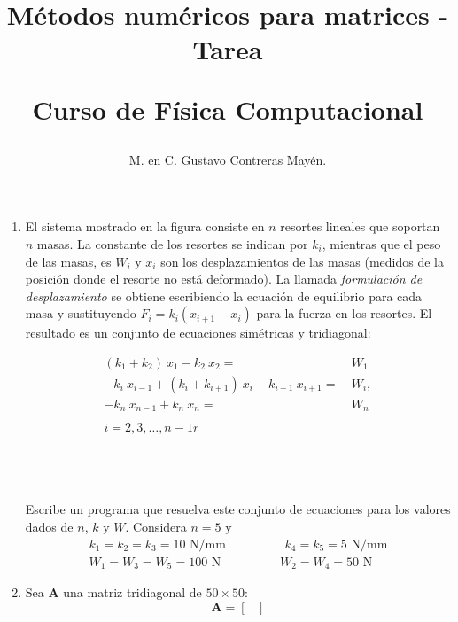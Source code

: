 \documentclass[12pt]{article}
\author{M. en C. Gustavo Contreras Mayén.}
\title{Métodos numéricos para matrices - Tarea \\ \begin{Large}Curso de Fí­sica Computacional\end{Large}}
\date{ }
\numberwithin{equation}{section}
\begin{document}
\fontsize{14}{14}\selectfont
\maketitle
\begin{enumerate}
\item El sistema mostrado en la figura consiste en $n$ resortes lineales que soportan $n$ masas. La constante de los resortes se indican por $k_{i}$, mientras que el peso de las masas, es $W_{i}$ y $x_{i}$ son los desplazamientos de las masas (medidos de la posición donde el resorte no está deformado). La llamada \emph{formulación de desplazamiento} se obtiene escribiendo la ecuación de equilibrio para cada masa y sustituyendo $F_{i} = k_{i}(x_{i + 1} - x_{i})$ para la fuerza en los resortes. El resultado es un conjunto de ecuaciones simétricas y tridiagonal:
\\
\begin{minipage}{0.5\textwidth}
\[ \begin{split}
(k_{1} + k_{2}) \: x_{1} - k_{2} \: x_{2} =& \: W_{1} \\
-k_{i} \: x_{i-1} + (k_{i} + k_{i+1}) \: x_{i} - k_{i+1} \: x_{i+1} =& \:  W_{i}, \\
-k_{n} \:  x_{n-1} + k_{n} \: x_{n} =& \: W_{n}
\\
\\
 i = 2, 3, \ldots, n-1r
\end{split} \]
\end{minipage}
\begin{minipage}{0.5\textwidth}
\begin{figure}[H]
	\centering
	
\end{figure}
\end{minipage}
\\
\\
\\
Escribe un programa que resuelva este conjunto de ecuaciones para los valores dados de $n$, $k$ y $W$. Considera $n=5$ y 
\[ \begin{split} 
k_{1} = k_{2} = k_{3} = 10 \mbox{ N/mm} \hspace{2cm} k_{4} = k_{5} = 5 \mbox{ N/mm} \\
W_{1} = W_{3} = W_{5} = 100 \mbox{ N} \hspace{2cm} W_{2} = W_{4} = 50 \mbox{ N}
\end{split} \]
\item Sea $\textbf{A}$ una matriz tridiagonal de $50 \times 50$:
\[
\mathbf{A} = \begin{bmatrix}

\end{bmatrix}\]
\end{enumerate}
\end{document}
